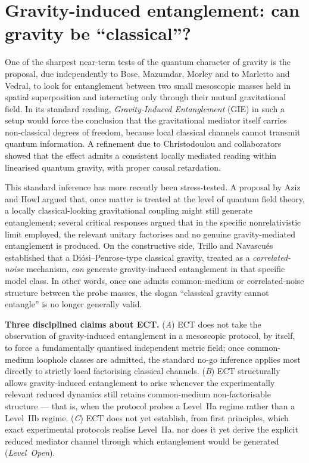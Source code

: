 \documentclass[11pt,a4paper]{article}
\begin{document}
\section{Gravity-induced entanglement: can gravity be ``classical''?}
\label{sec:pop_gie}

One of the sharpest near-term tests of the quantum character of
gravity is the proposal, due independently to Bose, Mazumdar, Morley
and to Marletto and Vedral, to look for entanglement between two
small mesoscopic masses held in spatial superposition and interacting
only through their mutual gravitational field. In its standard
reading, \emph{Gravity-Induced Entanglement} (GIE) in such a setup
would force the conclusion that the gravitational mediator itself
carries non-classical degrees of freedom, because local classical
channels cannot transmit quantum information. A refinement due to
Christodoulou and collaborators showed that the effect admits a
consistent locally mediated reading within linearised quantum
gravity, with proper causal retardation.

This standard inference has more recently been stress-tested.
A proposal by Aziz and Howl argued that, once matter is treated
at the level of quantum field theory, a locally classical-looking
gravitational coupling might still generate entanglement; several
critical responses argued that in the specific nonrelativistic
limit employed, the relevant unitary factorises and no genuine
gravity-mediated entanglement is produced. On the constructive side,
Trillo and Navascu\'es established that a Di\'osi--Penrose-type
classical gravity, treated as a \emph{correlated-noise} mechanism,
\emph{can} generate gravity-induced entanglement in that specific
model class. In other words, once one admits common-medium or
correlated-noise structure between the probe masses, the slogan
``classical gravity cannot entangle'' is no longer generally valid.

\textbf{Three disciplined claims about ECT.}
(\emph{A}) ECT does not take the observation of gravity-induced
entanglement in a mesoscopic protocol, by itself, to force a
fundamentally quantised independent metric field; once common-medium
loophole classes are admitted, the standard no-go inference applies
most directly to strictly local factorising classical channels.
(\emph{B}) ECT structurally allows gravity-induced entanglement to
arise whenever the experimentally relevant reduced dynamics still
retains common-medium non-factorisable structure --- that is, when
the protocol probes a Level~IIa regime rather than a Level~IIb
regime. (\emph{C}) ECT does not yet establish, from first principles,
which exact experimental protocols realise Level~IIa, nor does it
yet derive the explicit reduced mediator channel through which
entanglement would be generated (\emph{Level~Open}).
\end{document}
